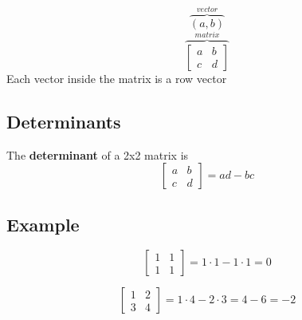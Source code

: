 \documentclass{article}
\begin{document}
\[\overbrace{(a,b)}^{vector}\]
\[\overbrace{\begin{bmatrix}
    a&b\\
    c&d
\end{bmatrix}}^{matrix}\]
Each vector inside the matrix is a row vector

\subsection{Determinants}
The \textbf{determinant} of a 2x2 matrix is 
\[\begin{bmatrix}
    a&b\\
    c&d
\end{bmatrix}=ad-bc\]

\subsection*{Example}

\[\begin{bmatrix}
    1&1\\
    1&1
\end{bmatrix}=1\cdot 1-1\cdot 1=0\]

\[\begin{bmatrix}
    1&2\\
    3&4
\end{bmatrix}=1\cdot 4-2\cdot 3=4-6=-2\]
\end{document}
